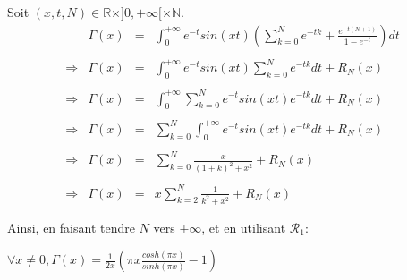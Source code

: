 Soit $(x, t, N)\in \mathbb{R}\times]0, +\infty[\times\mathbb{N}$.\\

\[
  \begin{array}{rrlc}
                & \Gamma(x) & = & \int_{0}^{+\infty} {e^{-t}sin(xt)\left(\sum\limits_{k=0}^{N}e^{-tk} + \frac{e^{-t(N+1)}}{1-e^{-t}}\right)dt} \\\\
    \Rightarrow & \Gamma(x) & = & \int_{0}^{+\infty} {e^{-t}sin(xt)\sum\limits_{k=0}^{N}e^{-tk}dt} + R_N(x)                                    \\\\
    \Rightarrow & \Gamma(x) & = & \int_{0}^{+\infty} {\sum\limits_{k=0}^{N}e^{-t}sin(xt)e^{-tk}dt} + R_N(x)                                    \\\\
    \Rightarrow & \Gamma(x) & = & \sum\limits_{k=0}^{N}\int_{0}^{+\infty} {e^{-t}sin(xt)e^{-tk}dt} + R_N(x)                                    \\\\
    \Rightarrow & \Gamma(x) & = & \sum\limits_{k=0}^{N} {\frac{x}{(1+k)^2+x^2}} + R_N(x)                                                       \\\\
    \Rightarrow & \Gamma(x) & = & x\sum\limits_{k=2}^{N} {\frac{1}{k^2+x^2}} + R_N(x)                                                          \\\\
  \end{array}
\]
Ainsi, en faisant tendre $N$ vers $+\infty$, et en utilisant $\mathcal{R}_1$:
\begin{result}
  $\forall x\neq 0, \Gamma(x) = \frac{1}{2x}\left(\pi x \frac{cosh(\pi x)}{sinh(\pi x)}-1\right)$
\end{result}
